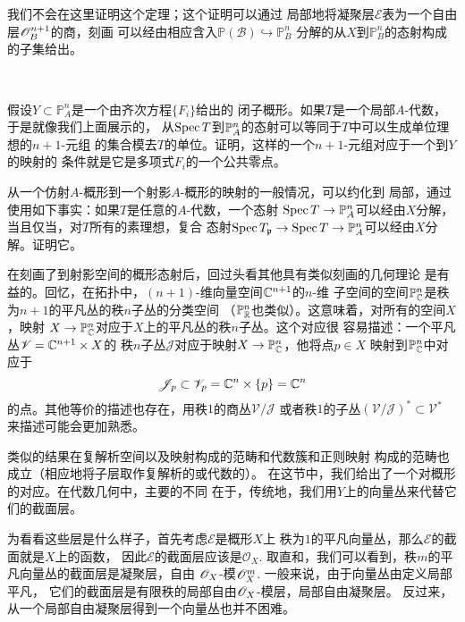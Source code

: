 我们不会在这里证明这个定理；这个证明可以通过
局部地将凝聚层$\mathscr E$表为一个自由层$\oo_B^{n+1}$的商，刻画
可以经由相应含入$\mathbb P(\mathscr B)\hookrightarrow \mathbb P_B^n$
分解的从$X$到$\mathbb P_B^n$的态射构成的子集给出。

\begin{exe}~\label{exe:3.45}
\begin{compactenum}[(a)]
\item 假设$Y\subset \mathbb P_A^n$是一个由齐次方程$\{F_i\}$给出的
闭子概形。如果$T$是一个局部$A$-代数，于是就像我们上面展示的，
从$\spec T$到$\P_A^n$的态射可以等同于$T$中可以生成单位理想的$n+1$-元组
的集合模去$T$的单位。证明，这样的一个$n+1$-元组对应于一个到$Y$的映射的
条件就是它是多项式$F_i$的一个公共零点。
\item 从一个仿射$A$-概形到一个射影$A$-概形的映射的一般情况，可以约化到
局部，通过使用如下事实：如果$T$是任意的$A$-代数，一个态射
$\spec T\to \P_A^n$可以经由$X$分解，当且仅当，对$T$所有的素理想，复合
态射$\spec T_\pp\to \spec T\to \P_A^n$可以经由$X$分解。证明它。
\end{compactenum}
\end{exe}


在刻画了到射影空间的概形态射后，回过头看其他具有类似刻画的几何理论
是有益的。回忆，在拓扑中，$(n+1)$-维向量空间$\cc^{n+1}$的$n$-维
子空间的空间$\P^n_\cc$是秩为$n+1$的平凡丛的秩$n$子丛的分类空间
（$\P_{\mathbb R}^n$也类似）。这意味着，对所有的空间$X$，映射
$X\to \mathbb P_\cc^n$对应于$X$上的平凡丛的秩$n$子丛。这个对应很
容易描述：一个平凡丛$\mathscr V=\cc^{n+1}\times X$的
秩$n$子丛$\mathscr J$对应于映射$X\to \P_\cc^n$，他将点$p\in X$
映射到$\mathbb P_\cc^n$中对应于
\[
	\mathscr J_p\subset \mathscr V_p=\cc^n\times \{p\}=\cc^n
\]
的点。其他等价的描述也存在，用秩$1$的商丛$\mathscr V/\mathscr J$
或者秩$1$的子丛$(\mathscr V/\mathscr J)^*\subset \mathscr V^*$
来描述可能会更加熟悉。

类似的结果在复解析空间以及映射构成的范畴和代数簇和正则映射
构成的范畴也成立（相应地将子层取作复解析的或代数的）。
在这节中，我们给出了一个对概形的对应。在代数几何中，主要的不同
在于，传统地，我们用$Y$上的向量丛来代替它们的截面层。

为看看这些层是什么样子，首先考虑$\mathscr E$是概形$X$上
秩为$1$的平凡向量丛，那么$\mathscr E$的截面就是$X$上的函数，
因此$\mathscr E$的截面层应该是$\mathscr O_X$.
取直和，我们可以看到，秩$m$的平凡向量丛的截面层是凝聚层，自由
$\oo_X$-模$\oo_X^m$. 一般来说，由于向量丛由定义局部平凡，
它们的截面层是有限秩的局部自由$\oo_X$-模层，局部自由凝聚层。
反过来，从一个局部自由凝聚层得到一个向量丛也并不困难。

